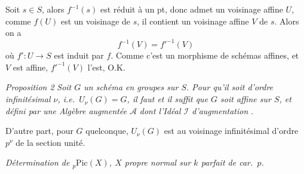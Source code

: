 \documentclass[11pt,a4paper]{article}
\begin{document}
\struck{\ill{}}

Soit $s \in S$, alors $f^{-1}(s)$ est réduit à un pt, donc admet un
voisinage affine $U$, comme $f(U)$ est un voisinage de
$s$, il contient un voisinage affine $V$ de $s$. Alors on a
\[
  f^{-1}(V) = f'^{-1}(V)
\]
où $f' : U \to S$ est induit par $f$. Comme c'est un morphisme de
schémas affines, et $V$ est affine, $f'^{-1}(V)$ l'est, O.K.


\emph{Proposition 2} \textit{Soit $G$ un schéma en groupes sur $S$. Pour
qu'il soit d'ordre infinitésimal $\nu$, i.e.\ $U_{\nu}(G) = G$, il faut et
il suffit que $G$ soit \emph{affine} sur $S$, et défini par une Algèbre
augmentée $\mathcal{A}$} \struck{\ill{} \ill{} \ill{}]} \textit{dont
l'Idéal $\mathcal{I}$ d'augmentation}   .

D'autre part, pour $G$ quelconque, $U_{\nu}(G)$ est
 
au voisinage infinitésimal d'ordre $p^{\nu}$
de la section unité.



\emph{Détermination de ${}_p\mathrm{Pic}(X)$, $X$ propre normal sur $k$
parfait de car.\ $p$.}
\end{document}
